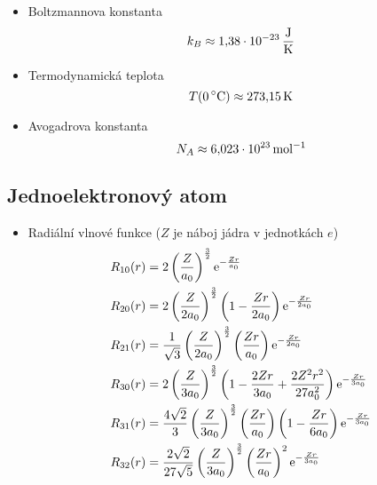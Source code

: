 \begin{itemize}
    \item Boltzmannova konstanta
        \begin{equation}
            k_{B}\approx1,\!38\cdot10^{-23}\,\mathrm{{\frac{J}{K}}}
        \end{equation}

    \item Termodynamická teplota
        \begin{equation}
            T(0\,\mathrm{{^{\circ}C}})\approx273,\!15\,\mathrm{{K}}
        \end{equation}

    \item Avogadrova konstanta
        \begin{equation}
            N_{A}\approx6,\!023\cdot10^{23}\,\mathrm{{mol^{-1}}}
        \end{equation}
\end{itemize}

\subsection{Jednoelektronový atom}
\begin{itemize}
    \item Radiální vlnové funkce ($Z$ je náboj jádra v jednotkách $e$)
        \begin{align}
            R_{10}(r)&=2\left(\frac{Z}{a_{0}}\right)^{\frac{3}{2}}\operatorname{e}^{-\frac{Zr}{a_{0}}}\\
            R_{20}(r)&=2\left(\frac{Z}{2a_{0}}\right)^{\frac{3}{2}}\left(1-\frac{Zr}{2a_{0}}\right)\operatorname{e}^{-\frac{Zr}{2a_{0}}}\\
            R_{21}(r)&=\frac{1}{\sqrt{3}}\left(\frac{Z}{2a_{0}}\right)^{\frac{3}{2}}\left(\frac{Zr}{a_{0}}\right)\operatorname{e}^{-\frac{Zr}{2a_{0}}}\\
            R_{30}(r)&=2\left(\frac{Z}{3a_{0}}\right)^{\frac{3}{2}}\left(1-\frac{2Zr}{3a_{0}}+\frac{2Z^{2}r^{2}}{27a_{0}^{2}}\right)\operatorname{e}^{-\frac{Zr}{3a_{0}}}\\
            R_{31}(r)&=\frac{4\sqrt{2}}{3}\left(\frac{Z}{3a_{0}}\right)^{\frac{3}{2}}\left(\frac{Zr}{a_{0}}\right)\left(1-\frac{Zr}{6a_{0}}\right)\operatorname{e}^{-\frac{Zr}{3a_{0}}}\\
            R_{32}(r)&=\frac{2\sqrt{2}}{27\sqrt{5}}\left(\frac{Z}{3a_{0}}\right)^{\frac{3}{2}}\left(\frac{Zr}{a_{0}}\right)^{2}\operatorname{e}^{-\frac{Zr}{3a_{0}}}
        \end{align}
\end{itemize}